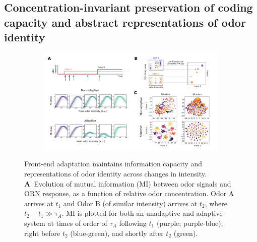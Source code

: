 
\subsection{Concentration-invariant preservation of coding capacity and abstract representations of odor identity}



\begin{figure}[!tb]
	\centering
	\begin{subfigure}[t]{\linewidth}
		\includegraphics[width=\textwidth]{figures/2_coding_representation}
		\label{fig:coding_a}
	\end{subfigure}
	\begin{subfigure}[t]{0\linewidth}
		\label{fig:coding_b}
	\end{subfigure}
	\caption{\footnotesize{Front-end adaptation maintains information capacity and representations of odor identity across changes in intensity. 
    	\textbf{A}~Evolution of mutual information (MI) between odor signals and ORN response, as a function of relative odor concentration. Odor A arrives  at $t_1$ and Odor B (of similar intensity) arrives at $t_2$, where $t_2 - t_1 \gg \tau_A$. MI is plotted for both an unadaptive and adaptive system at times of order of $\tau_A$ following $t_1$ (purple; purple-blue), right before $t_2$ (blue-green), and shortly after $t_2$ (green). 
}}
\end{figure}
